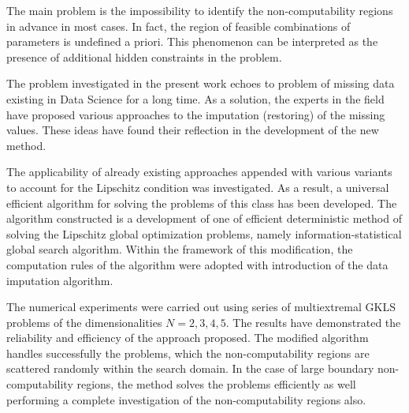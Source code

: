 \documentclass[runningheads]{llncs}
\begin{document}
The main problem is the impossibility to identify the non-computability regions in advance in most cases. In fact, the region of feasible combinations of parameters is undefined a priori. This phenomenon can be interpreted as the presence of additional hidden constraints in the problem.

The problem investigated in the present work echoes to problem of missing data existing in Data Science for a long time. As a solution, the experts in the field have proposed various approaches to the imputation (restoring) of the missing values. These ideas have found their reflection in the development of the new method.

The applicability of already existing approaches appended with various variants to account for the Lipschitz condition was investigated. As a result, a universal efficient algorithm for solving the problems of this class has been developed. The algorithm constructed is a development of one of efficient deterministic method of solving the Lipschitz global optimization problems, namely information-statistical global search algorithm. Within the framework of this modification, the computation rules of the algorithm were adopted with introduction of the data imputation algorithm.

The numerical experiments were carried out using series of multiextremal GKLS problems of the dimensionalities $N = 2,3,4,5$. The results have demonstrated the reliability and efficiency of the approach proposed. The modified algorithm handles successfully the problems, which the non-computability regions are scattered randomly within the search domain. In the case of large boundary non-computability regions, the method solves the problems efficiently as well performing a complete investigation of the non-computability regions also.


%
%
%


\end{document}
